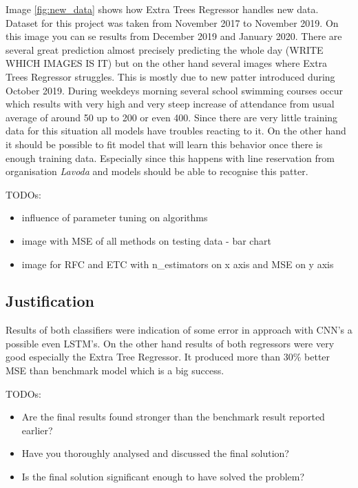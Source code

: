 \documentclass{article}
\begin{document}
Image \ref{fig:new_data} shows how Extra Trees Regressor handles new data. Dataset for this project was taken from November 2017 to November 2019. On this image you can se results from December 2019 and January 2020. There are several great prediction almost precisely predicting the whole day (WRITE WHICH IMAGES IS IT) but on the other hand several images where Extra Trees Regressor struggles. This is mostly due to new patter introduced during October 2019. During weekdeys morning several school swimming courses occur which results with very high and very steep increase of attendance from usual average of around 50 up to 200 or even 400. Since there are very little training data for this situation all models have troubles reacting to it. On the other hand it should be possible to fit model that will learn this behavior once there is enough training data. Especially since this happens with line reservation from organisation \emph{Lavoda} and models should be able to recognise this patter.

\color{red}
TODOs:
\begin{itemize}
    \item influence of parameter tuning on algorithms
    \item image with MSE of all methods on testing data - bar chart
    \item image for RFC and ETC with n\_estimators on x axis and MSE on y axis
\end{itemize}
\color{black}

\subsection{Justification}
Results of both classifiers were indication of some error in approach with CNN's a possible even LSTM's. On the other hand results of both regressors were very good especially the Extra Tree Regressor. It produced more than 30\% better MSE than benchmark model which is a big success. 

\color{red}
TODOs:
\begin{itemize}
    \item Are the final results found stronger than the benchmark result reported earlier?
    \item Have you thoroughly analysed and discussed the final solution?
    \item Is the final solution significant enough to have solved the problem?
\end{itemize}
\color{black}
\end{document}

